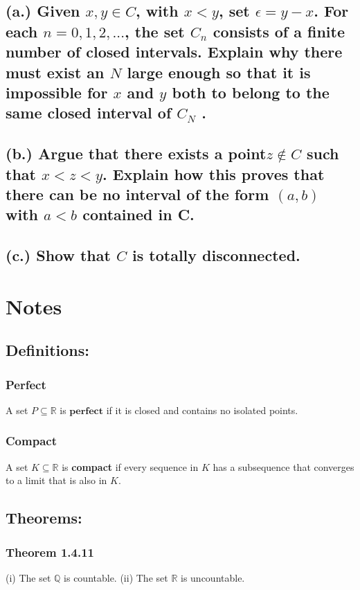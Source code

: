 \documentclass{article}
\begin{document}
\subsection*{(a.)  Given $x, y \in C$, with $x < y$, set $\epsilon = y - x$. For each $n = 0, 1, 2,... $, the set $C_n$ consists of a finite number of closed intervals. Explain why there must exist an $N$ large enough so that it is impossible for $x$ and $y$ both to belong to the same closed interval of $C_N$ .}



\subsection*{(b.) Argue that there exists a point$ z \notin C$ such that $x<z<y$. Explain how
this proves that there can be no interval of the form $(a, b)$ with $a<b$ contained
in C.}



\subsection*{(c.) Show that $C$ is totally disconnected.}










\section*{Notes}
\subsection*{\textbf{Definitions:}}
\subsubsection*{Perfect}
A set $P \subseteq \mathbb{R}$ is $\textbf{perfect}$ if it is closed and contains no isolated points.
\subsubsection*{Compact}
A set $K \subseteq \mathbb{R}$ is \textbf{compact} if every sequence in $K$ has a subsequence that converges to a limit that is also in $K$.

\subsection*{\textbf{Theorems:}}
\subsubsection*{Theorem 1.4.11}
(i) The set $\mathbb{Q}$ is countable. (ii) The set $\mathbb{R}$ is uncountable.
\end{document}
